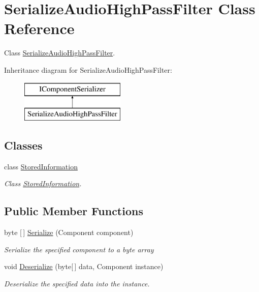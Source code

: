 \hypertarget{class_serialize_audio_high_pass_filter}{}\section{Serialize\+Audio\+High\+Pass\+Filter Class Reference}
\label{class_serialize_audio_high_pass_filter}


Class \hyperlink{class_serialize_audio_high_pass_filter}{Serialize\+Audio\+High\+Pass\+Filter}.  


Inheritance diagram for Serialize\+Audio\+High\+Pass\+Filter\+:\begin{figure}[H]
\begin{center}
\leavevmode
\includegraphics[height=2.000000cm]{class_serialize_audio_high_pass_filter}
\end{center}
\end{figure}
\subsection*{Classes}
\begin{DoxyCompactItemize}
\item 
class \hyperlink{class_serialize_audio_high_pass_filter_1_1_stored_information}{Stored\+Information}
\begin{DoxyCompactList}\small\item\em Class \hyperlink{class_serialize_audio_high_pass_filter_1_1_stored_information}{Stored\+Information}. \end{DoxyCompactList}\end{DoxyCompactItemize}
\subsection*{Public Member Functions}
\begin{DoxyCompactItemize}
\item 
byte \mbox{[}$\,$\mbox{]} \hyperlink{class_serialize_audio_high_pass_filter_ae26f6c970a4912689ae3a7300fdc9139}{Serialize} (Component component)
\begin{DoxyCompactList}\small\item\em Serialize the specified component to a byte array \end{DoxyCompactList}\item 
void \hyperlink{class_serialize_audio_high_pass_filter_a12318bb13445fae737731dc3e1d7172b}{Deserialize} (byte\mbox{[}$\,$\mbox{]} data, Component instance)
\begin{DoxyCompactList}\small\item\em Deserialize the specified data into the instance. \end{DoxyCompactList}\end{DoxyCompactItemize}


